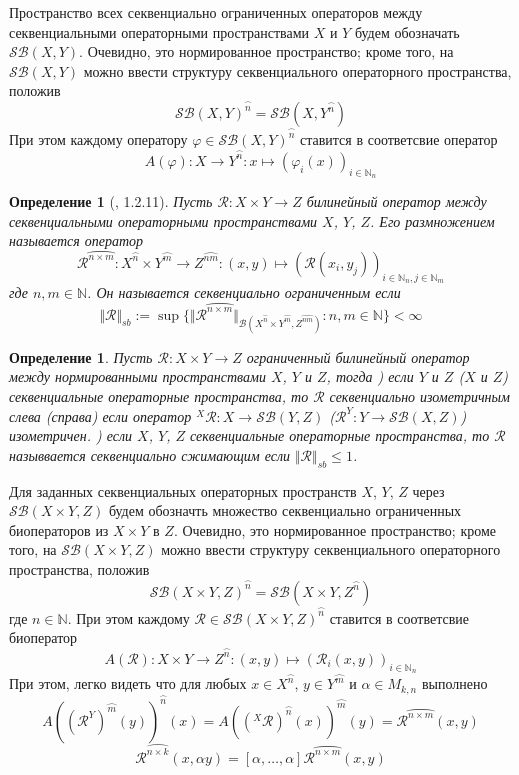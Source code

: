 \documentclass[12pt]{article}
\newtheorem{definition}[theorem]{Определение}
\begin{document}
Пространство всех секвенциально ограниченных операторов между секвенциальными операторными пространствами $X$ и $Y$ будем обозначать $\mathcal{SB}(X, Y)$. Очевидно, это нормированное пространство; кроме того, на $\mathcal{SB}(X, Y)$ 
можно ввести структуру секвенциального операторного пространства, положив
$$
\mathcal{SB}(X, Y)^{\wideparen{n}} = \mathcal{SB}(X, Y^{\wideparen{n}})
$$
При этом каждому оператору $\varphi\in\mathcal{SB}(X,Y)^{\wideparen{n}}$ ставится в соответсвие оператор 
$$
A(\varphi):X\to Y^{\wideparen{n}}:x\mapsto(\varphi_i(x))_{i\in\mathbb{N}_n}
$$

\begin{definition}[\cite{LamOpFolgen}, 1.2.11]\label{DefSBbiOp}
Пусть $\mathcal{R}:X\times Y\to Z$ билинейный оператор между секвенциальными операторными пространствами $X$, $Y$, $Z$. Его размножением называется оператор
$$
\mathcal{R}^{\wideparen{n\times m}}:X^{\wideparen{n}}\times Y^{\wideparen{m}}\to Z^{\wideparen{nm}}:(x,y)\mapsto(\mathcal{R}(x_i,y_j))_{i\in\mathbb{N}_n,j\in\mathbb{N}_m}
$$
где $n,m\in\mathbb{N}$. Он называется секвенциально ограниченным если
$$
\Vert\mathcal{R}\Vert_{sb}:=\sup\{\Vert \mathcal{R}^{\wideparen{n\times m}}\Vert_{\mathcal{B}(X^{\wideparen{n}}\times Y^{\wideparen{m}}, Z^{\wideparen{nm}})}:n,m\in\mathbb{N}\}<\infty
$$
\end{definition}

\begin{definition}\label{DefSBBiOpType}
Пусть $\mathcal{R}:X\times Y\to Z$ ограниченный билинейный оператор между нормированными пространствами $X$, $Y$ и $Z$, тогда
) если $Y$ и $Z$ ($X$ и $Z$) секвенциальные операторные пространства, то $\mathcal{R}$ секвенциально изометричным слева (справа) если оператор ${}^X\mathcal{R}:X\to\mathcal{SB}(Y,Z)$ ($\mathcal{R}^Y:Y\to\mathcal{SB}(X,Z)$) изометричен.
) если $X$, $Y$, $Z$ секвенциальные операторные пространства, то $\mathcal{R}$ назыввается секвенциально сжимающим если $\Vert \mathcal{R}\Vert_{sb}\leq 1$.
\end{definition}

Для заданных секвенциальных операторных пространств $X$, $Y$, $Z$ через $\mathcal{SB}(X\times Y, Z)$ будем обозначть множество секвенциально ограниченных биоператоров из $X\times Y$ в $Z$. Очевидно, это нормированное пространство; 
кроме того, на $\mathcal{SB}(X\times Y, Z)$ можно ввести структуру секвенциального операторного пространства, положив
$$
\mathcal{SB}(X\times Y, Z)^{\wideparen{n}}=\mathcal{SB}(X\times Y,Z^{\wideparen{n}})
$$
где $n\in\mathbb{N}$. При этом каждому $\mathcal{R}\in\mathcal{SB}(X\times Y,Z)^{\wideparen{n}}$ ставится в соответсвие биоператор 
$$
A(\mathcal{R}):X\times Y\to Z^{\wideparen{n}}:(x,y)\mapsto(\mathcal{R}_i(x,y))_{i\in\mathbb{N}_n}
$$
При этом, легко видеть что для любых $x\in X^{\wideparen{n}}$, $y\in Y^{\wideparen{m}}$ и $\alpha\in M_{k,n}$  выполнено
$$
A((\mathcal{R}^Y)^{\wideparen{m}}(y))^{\wideparen{n}}(x)=A(({}^X\mathcal{R})^{\wideparen{n}}(x))^{\wideparen{m}}(y)=\mathcal{R}^{\wideparen{n\times m}}(x,y)
$$
$$
\mathcal{R}^{\wideparen{n\times k}}(x,\alpha y)
=[\alpha,\ldots,\alpha]\mathcal{R}^{\wideparen{n\times m}}(x,y)
$$
\end{document}
